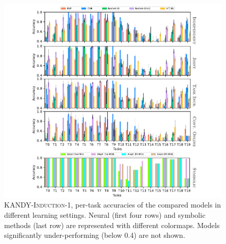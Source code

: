 \begin{figure}[!ht]

	\centering
	\includegraphics[width=1.0\textwidth]{imgs/kandy/Fig8.pdf}
	\caption[Per-task accuracies over time on \textsc{KANDY-Induction-1}]{\textsc{KANDY-Induction-1}, per-task accuracies of the compared models in different learning settings. Neural (first four rows) and symbolic methods (last row) are represented with different colormaps. Models significantly under-performing (below 0.4) are not shown.}
	\label{kandy:fig:acc_per_task_easy}
\end{figure}

